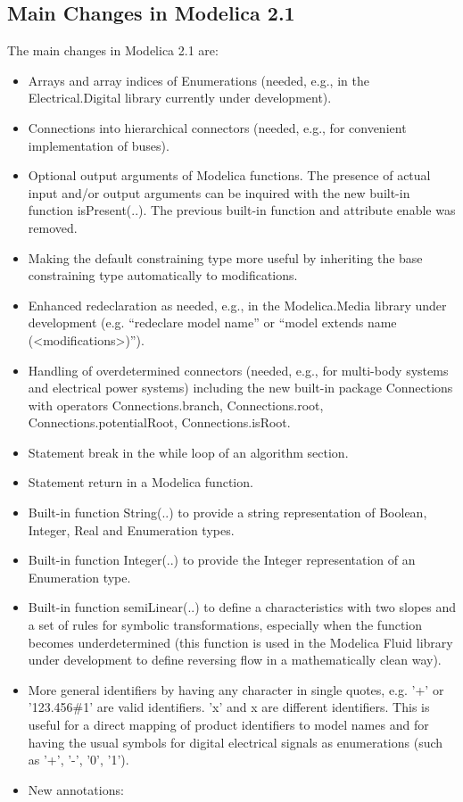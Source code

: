 \documentclass[10pt,a4paper]{report}
\def\doublelabel#1{\label{#1}\hypertarget{#1}{}}
\begin{document}
\subsection{Main Changes in Modelica 2.1}\doublelabel{main-changes-in-modelica-2-1}

The main changes in Modelica 2.1 are:

\begin{itemize}
\item
  Arrays and array indices of Enumerations (needed, e.g., in the
  Electrical.Digital library currently under development).
\item
  Connections into hierarchical connectors (needed, e.g., for convenient
  implementation of buses).
\item
  Optional output arguments of Modelica functions. The presence of
  actual input and/or output arguments can be inquired with the new
  built-in function isPresent(..). The previous built-in function and
  attribute enable was removed.
\item
  Making the default constraining type more useful by inheriting the
  base constraining type automatically to modifications.
\item
  Enhanced redeclaration as needed, e.g., in the Modelica.Media library
  under development (e.g. ``redeclare model name'' or ``model extends
  name (\textless{}modifications\textgreater{})'').
\item
  Handling of overdetermined connectors (needed, e.g., for multi-body
  systems and electrical power systems) including the new built-in
  package Connections with operators Connections.branch,
  Connections.root, Connections.potentialRoot, Connections.isRoot.
\item
  Statement break in the while loop of an algorithm section.
\item
  Statement return in a Modelica function.
\item
  Built-in function String(..) to provide a string representation of
  Boolean, Integer, Real and Enumeration types.
\item
  Built-in function Integer(..) to provide the Integer representation of
  an Enumeration type.
\item
  Built-in function semiLinear(..) to define a characteristics with two
  slopes and a set of rules for symbolic transformations, especially
  when the function becomes underdetermined (this function is used in
  the Modelica Fluid library under development to define reversing flow
  in a mathematically clean way).
\item
  More general identifiers by having any character in single quotes,
  e.g. '+' or '123.456\#1' are valid identifiers. 'x' and x are
  different identifiers. This is useful for a direct mapping of product
  identifiers to model names and for having the usual symbols for
  digital electrical signals as enumerations (such as '+', '-', '0',
  '1').
\item
  New annotations:
\end{itemize}
\end{document}
